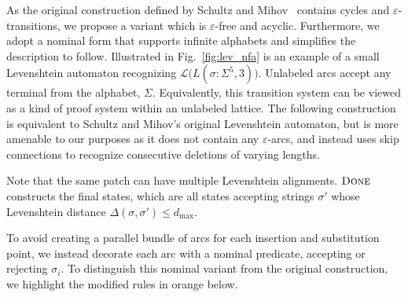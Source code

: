 \documentclass[sigplan,review,acmsmall,nonacm,screen,anonymous]{acmart}\settopmatter{printfolios=false,printccs=false,printacmref=false}
\begin{document}
As the original construction defined by Schultz and Mihov~\cite{schulz2002fast} contains cycles and $\varepsilon$-transitions, we propose a variant which is $\varepsilon$-free and acyclic. Furthermore, we adopt a nominal form that supports infinite alphabets and simplifies the description to follow. Illustrated in Fig.~\ref{fig:lev_nfa} is an example of a small Levenshtein automaton recognizing $\mathcal{L}\big(L(\sigma: \Sigma^5, 3)\big)$. Unlabeled arcs accept any terminal from the alphabet, $\Sigma$. Equivalently, this transition system can be viewed as a kind of proof system within an unlabeled lattice. The following construction is equivalent to Schultz and Mihov's original Levenshtein automaton, but is more amenable to our purposes as it does not contain any $\varepsilon$-arcs, and instead uses skip connections to recognize consecutive deletions of varying lengths.



Note that the same patch can have multiple Levenshtein alignments. $\textsc{Done}$ constructs the final states, which are all states accepting strings $\sigma'$ whose Levenshtein distance $\Delta(\sigma, \sigma') \leq d_\max$.

To avoid creating a parallel bundle of arcs for each insertion and substitution point, we instead decorate each arc with a nominal predicate, accepting or rejecting $\sigma_i$. To distinguish this nominal variant from the original construction, we highlight the modified rules in orange below.

\end{document}
